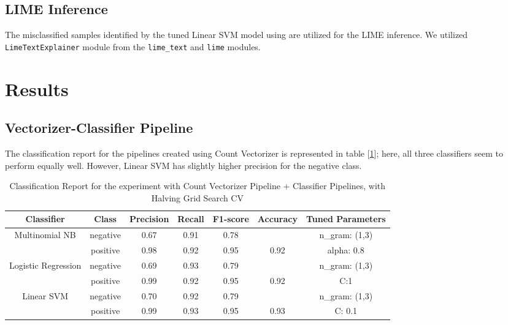 \documentclass[11pt]{article}
\begin{document}
\subsection{LIME Inference}
The misclassified samples identified by the tuned Linear SVM model using are utilized for the LIME inference. We utilized \texttt{LimeTextExplainer} module from the \texttt{lime\_text} and \texttt{lime} modules.
 
 \section{Results}

\subsection{Vectorizer-Classifier Pipeline}

The classification report for the  pipelines created using Count Vectorizer is represented in table [\ref{tab:cvec_class_report}]; here, all three classifiers seem to perform equally well. However, Linear SVM has slightly higher precision for the negative class.
\begin{table}
\scriptsize
\centering
    \begin{tabular}{c c c c c c c}
    \hline
       \textbf{Classifier}& \textbf{Class} & \textbf{Precision} &  \textbf{Recall} & \textbf{F1-score}  & \textbf{Accuracy} & \textbf{Tuned Parameters} \\ \hline 
       Multinomial NB & negative &0.67 &0.91 &0.78& &n\_gram: (1,3)  \\
       & positive &0.98&0.92& 0.95 & 0.92 & alpha: 0.8\\ \hline 
       Logistic Regression & negative &0.69& 0.93& 0.79 & & n\_gram: (1,3)\\
       & positive&0.99 &0.92 &0.95&0.92 & C:1\\ \hline 
       Linear SVM & negative& 0.70& 0.92& 0.79 & &  n\_gram: (1,3)\\ 
       & positive & 0.99&0.93 &0.95&0.93 & C: 0.1\\ \hline 
    \end{tabular}
    \caption{Classification Report for the experiment with Count Vectorizer Pipeline + Classifier Pipelines, with Halving Grid Search CV}
    \label{tab:cvec_class_report}
\end{table}
\end{document}

